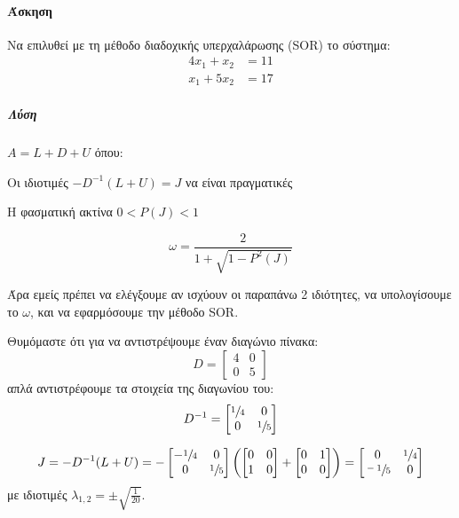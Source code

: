 \documentclass[11pt,a4paper,notitlepage,fleqn]{article}
\begin{document}
\paragraph{Άσκηση}
Να επιλυθεί με τη μέθοδο διαδοχικής υπερχαλάρωσης (SOR) το σύστημα:
\begin{align*}
	4x_1+x_2 &= 11 \\
	x_1+5x_2 &= 17
\end{align*}
\subparagraph{Λύση}
\( A= L+D+U \) όπου:
\begin{enumroman}
	\item Οι ιδιοτιμές \( -D^{-1}(L+U) = J \) να είναι πραγματικές
	\item Η φασματική ακτίνα \( 0 < P(J) < 1 \)
\end{enumroman}
\[
\omega = \frac{2}{1+\sqrt{1-P^2(J)}}
\]

Άρα εμείς πρέπει να ελέγξουμε αν ισχύουν οι παραπάνω 2 ιδιότητες, να
υπολογίσουμε το \( \omega \), και να εφαρμόσουμε την μέθοδο SOR.

\begin{infobox}{}
	Θυμόμαστε ότι για να αντιστρέψουμε έναν διαγώνιο πίνακα:
	\[
	D = \left[\begin{matrix}
	4&0\\0&5
	\end{matrix}\right]
	\]
	απλά αντιστρέφουμε τα στοιχεία της διαγωνίου του:
	\[
	D^{-1} = \left[\begin{matrix}
	\sfrac{1}{4} & 0 \\ 0 & \sfrac{1}{5} 
	\end{matrix}\right]
	\]
\end{infobox}

\begin{align*}
	J = -D^{-1} (L+U) = -\left[\begin{matrix}
	-\sfrac{1}{4}  & 0 \\ 0 & \sfrac{1}{5} 
	\end{matrix}
	\right]\left(\left[\begin{matrix}
	0&0\\1&0
	\end{matrix}\right] + \left[\begin{matrix}
	0 & 1 \\ 0 & 0
	\end{matrix}\right]\right) = \left[\begin{matrix}
	0 & \sfrac{1}{4}  \\ \sfrac{-1}{5} & 0
	\end{matrix}\right]
\end{align*}
με ιδιοτιμές \( \lambda_{1,2} = \pm \sqrt{\frac{1}{20}} \).
\end{document}
